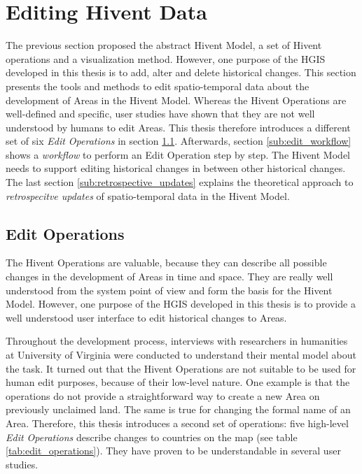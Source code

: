 
\section{Editing Hivent Data} %
\label{sec:editing_hivent_data}

The previous section proposed the abstract Hivent Model, a set of Hivent operations and a visualization method. However, one purpose of the HGIS developed in this thesis is to add, alter and delete historical changes. This section presents the tools and methods to edit spatio-temporal data about the development of Areas in the Hivent Model. Whereas the Hivent Operations are well-defined and specific, user studies have shown that they are not well understood by humans to edit Areas. This thesis therefore introduces a different set of six \emph{Edit Operations} in section \ref{sub:edit_operations}. Afterwards, section \ref{sub:edit_workflow} shows a \emph{workflow} to perform an Edit Operation step by step. The Hivent Model needs to support editing historical changes in between other historical changes. The last section \ref{sub:retrospective_updates} explains the theoretical approach to \emph{retrospecitve updates} of spatio-temporal data in the Hivent Model.

\subsection{Edit Operations} %
\label{sub:edit_operations}

The Hivent Operations are valuable, because they can describe all possible changes in the development of Areas in time and space. They are really well understood from the system point of view and form the basis for the Hivent Model. However, one purpose of the HGIS developed in this thesis is to provide a well understood user interface to edit historical changes to Areas.

Throughout the development process, interviews with researchers in humanities at University of Virginia were conducted to understand their mental model about the task. It turned out that the Hivent Operations are not suitable to be used for human edit purposes, because of their low-level nature. One example is that the operations do not provide a straightforward way to create a new Area on previously unclaimed land. The same is true for changing the formal name of an Area. Therefore, this thesis introduces a second set of operations: five high-level \emph{Edit Operations} describe changes to countries on the map (see table \ref{tab:edit_operations}). They have proven to be understandable in several user studies.

